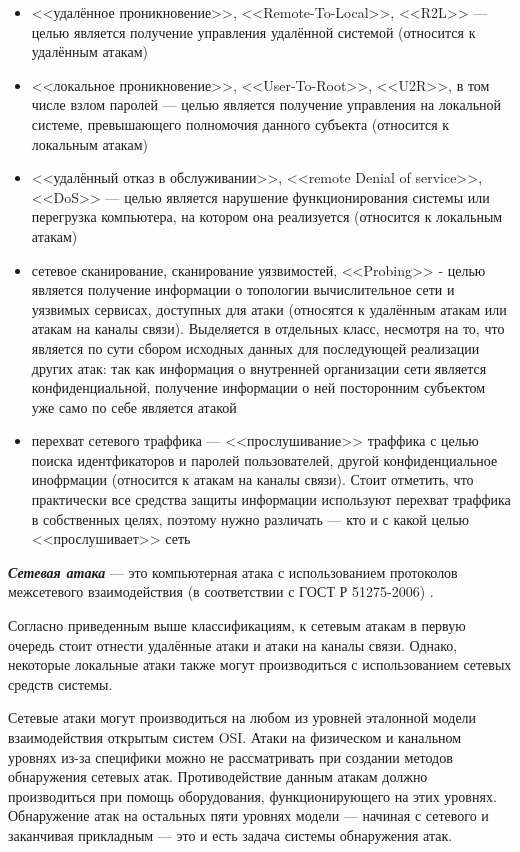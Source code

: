 \begin{itemize}

\item <<удалённое проникновение>>, <<Remote-To-Local>>, <<R2L>> --- целью является получение управления удалённой системой (относится к удалённым атакам)

\item <<локальное проникновение>>, <<User-To-Root>>, <<U2R>>, в том числе взлом паролей --- целью является получение управления на локальной системе, превышающего полномочия данного субъекта (относится к локальным атакам)

\item <<удалённый отказ в обслуживании>>, <<remote Denial of service>>, <<DoS>> --- целью является нарушение функционирования системы или перегрузка компьютера, на котором она реализуется (относится к локальным атакам)

\item сетевое сканирование, сканирование уязвимостей, <<Probing>> - целью является получение информации о топологии вычислительное сети и уязвимых сервисах, доступных для атаки (относятся к удалённым атакам или атакам на каналы связи). Выделяется в отдельных класс, несмотря на то, что является по сути сбором исходных данных для последующей реализации других атак: так как информация о внутренней организации сети является конфиденциальной, получение информации о ней посторонним субъектом уже само по себе является атакой

\item перехват сетевого траффика --- <<прослушивание>> траффика с целью поиска идентфикаторов и паролей пользователей, другой конфиденциальное инофрмации (относится к атакам на каналы связи). Стоит отметить, что практически все средства защиты информации используют перехват траффика в собственных целях, поэтому нужно различать --- кто и с какой целью <<прослушивает>> сеть

\end{itemize}

\textit{\textbf{Сетевая атака}} --- это компьютерная атака с использованием протоколов межсетевого взаимодействия (в соответствии с ГОСТ Р 51275-2006) \cite{bib:gostAttack}.

Согласно приведенным выше классификациям, к сетевым атакам в первую очередь стоит отнести удалённые атаки и атаки на каналы связи. Однако, некоторые локальные атаки также могут производиться с использованием сетевых средств системы.

Сетевые атаки могут производиться на любом из уровней эталонной модели взаимодействия открытым систем OSI. Атаки на физическом и канальном уровнях из-за специфики можно не рассматривать при создании методов обнаружения сетевых атак. Противодействие данным атакам должно производиться при помощь оборудования, функционирующего на этих уровнях. Обнаружение атак на остальных пяти уровнях модели --- начиная с сетевого и заканчивая прикладным --- это и есть задача системы обнаружения атак.

